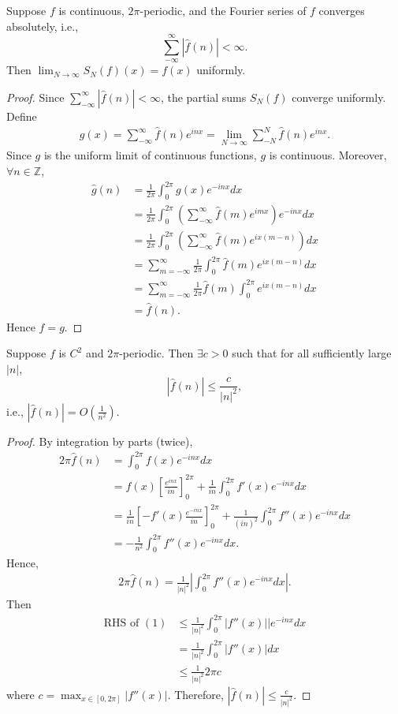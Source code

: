 \documentclass[11pt]{article}
\begin{document}
\begin{corollary} Suppose $f$ is continuous, $2\pi$-periodic, and the Fourier series of $f$ converges absolutely, i.e., $$\sum_{-\infty}^\infty |\hat{f}(n) | < \infty.$$ Then $\lim_{N \to \infty} S_N(f) (x) = f(x)$ uniformly.
\end{corollary}
\begin{proof} Since $\sum_{-\infty}^\infty |\hat{f}(n) | < \infty$, the partial sums $S_N(f)$ converge uniformly. Define \begin{align*} g(x) = \sum_{-\infty}^\infty \hat{f}(n) e^{inx} = \lim_{N \to \infty} \sum_{-N}^N \hat{f}(n) e^{inx}.
\end{align*} Since $g$ is the uniform limit of continuous functions, $g$ is continuous. Moreover, $\forall n \in \mathbb{Z}$, \begin{align*} \hat{g}(n) & = \frac{1}{2\pi} \int_0^{2\pi} g(x) e^{-inx} dx \\ & = \frac{1}{2\pi} \int_0^{2\pi} \left( \sum_{-\infty}^\infty \hat{f} (m) e^{imx} \right) e^{-inx} dx \\ &  = \frac{1}{2\pi} \int_0^{2\pi} \left( \sum_{-\infty}^\infty \hat{f}(m) e^{ix(m - n)} \right) dx \\ & = \sum_{m = -\infty}^\infty \frac{1}{2\pi} \int_0^{2\pi} \hat{f} (m) e^{ix(m-n)} dx \\ & = \sum_{m = -\infty}^\infty \frac{1}{2\pi} \hat{f}(m) \int_0^{2\pi} e^{ix(m-n)} dx \\ & = \hat{f}(n).
\end{align*}
Hence $f = g$.
\end{proof}

\begin{lemma} Suppose $f$ is $C^2$ and $2\pi$-periodic. Then $\exists c > 0$ such that for all sufficiently large $|n|$, $$|\hat{f}(n)| \le \frac{c}{|n|^2},$$ i.e., $|\hat{f}(n)| = O\left(\frac{1}{n^2}\right)$.
\end{lemma}
\begin{proof} By integration by parts (twice), \begin{align*} 2 \pi \hat{f}(n) & = \int_0^{2\pi} f(x) e^{-inx} dx \\ & = f(x) \left[ \frac{e^{inx}}{in} \right]_{0}^{2\pi} + \frac{1}{in} \int_0^{2\pi} f'(x) e^{-inx} dx \\ & = \frac{1}{in} \left[ -f'(x) \frac{e^{-inx}}{in} \right]_0^{2\pi} + \frac{1}{(in)^2} \int_0^{2\pi} f''(x) e^{-inx} dx \\ & = - \frac{1}{n^2} \int_0^{2\pi} f''(x) e^{-inx} dx.
\end{align*} Hence, \begin{align*} 2 \pi \hat{f}(n) = \frac{1}{|n|^2} \left| \int_0^{2\pi} f''(x) e^{-inx} dx \right|. \tag{1}
\end{align*} Then \begin{align*} \mathrm{RHS} \text{ of } (1) & \le \frac{1}{|n|^2} \int_0^{2\pi} |f''(x)| |e^{-inx} dx \\ & = \frac{1}{|n|^2} \int_0^{2\pi} |f''(x)| dx \\ & \le \frac{1}{|n|^2} 2\pi c
\end{align*}
where $c = \max_{x \in [0, 2\pi]} |f''(x)|$. Therefore, $|\hat{f}(n)| \le \frac{c}{|n|^2}$.
\end{proof}
\end{document}
